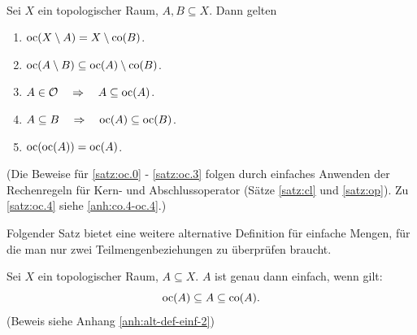     \begin{satz} \label{satz:oc} \ \vspace{8pt}

        \noindent
        Sei $X$ ein topologischer Raum, $A, B \subseteq X$. Dann gelten
        \begin{enumerate}
            \item \label{satz:oc.0} $\text{oc}(X \setminus A) = X \setminus \text{co}(B)$.
            \item \label{satz:oc.1} $\text{oc}(A \setminus B) \subseteq \text{oc}(A) \setminus \text{co}(B)$.
            \item \label{satz:oc.2} $A \in \mathcal{O} \quad \Rightarrow \quad A \subseteq \text{oc}(A)$.
            \item \label{satz:oc.3} $A \subseteq B \quad \Rightarrow \quad \text{oc}(A) \subseteq \text{oc}(B)$.
            \item \label{satz:oc.4} $\text{oc}(\text{oc}(A)) = \text{oc}(A)$.
        \end{enumerate}	
        
        (Die Beweise für \ref{satz:oc.0} - \ref{satz:oc.3} folgen durch einfaches Anwenden der Rechenregeln für Kern- und Abschlussoperator (Sätze \ref{satz:cl} und \ref{satz:op}). Zu \ref{satz:oc.4} siehe \ref{anh:co.4-oc.4}.)
        
    \end{satz}

    Folgender Satz bietet eine weitere alternative Definition für einfache Mengen, für die man nur zwei Teilmengenbeziehungen zu überprüfen braucht.
    \begin{satz}\label{satz:alt-def-einf-2}
        Sei $X$ ein topologischer Raum, $A \subseteq X$. $A$ ist genau dann einfach, wenn gilt:
        $$ \text{oc}(A) \subseteq A \subseteq \text{co}(A).$$
        (Beweis siehe Anhang \ref{anh:alt-def-einf-2})
    \end{satz}


